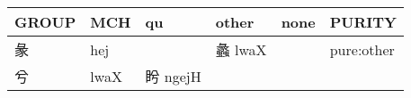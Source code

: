 \documentclass[14pt,a4paper]{scrartcl}
\begin{document}
\begin{longtable}[c]{@{}llllll@{}}
\toprule
\begin{minipage}[b]{0.14\columnwidth}\raggedright\strut
GROUP
\strut\end{minipage} &
\begin{minipage}[b]{0.14\columnwidth}\raggedright\strut
MCH
\strut\end{minipage} &
\begin{minipage}[b]{0.14\columnwidth}\raggedright\strut
qu
\strut\end{minipage} &
\begin{minipage}[b]{0.14\columnwidth}\raggedright\strut
other
\strut\end{minipage} &
\begin{minipage}[b]{0.14\columnwidth}\raggedright\strut
none
\strut\end{minipage} &
\begin{minipage}[b]{0.14\columnwidth}\raggedright\strut
PURITY
\strut\end{minipage}\tabularnewline
\midrule
\endhead
\begin{minipage}[t]{0.14\columnwidth}\raggedright\strut
彖
\strut\end{minipage} &
\begin{minipage}[t]{0.14\columnwidth}\raggedright\strut
hej
\strut\end{minipage} &
\begin{minipage}[t]{0.14\columnwidth}\raggedright\strut
\strut\end{minipage} &
\begin{minipage}[t]{0.14\columnwidth}\raggedright\strut
蠡 lwaX
\strut\end{minipage} &
\begin{minipage}[t]{0.14\columnwidth}\raggedright\strut
\strut\end{minipage} &
\begin{minipage}[t]{0.14\columnwidth}\raggedright\strut
pure:other
\strut\end{minipage}\tabularnewline
\begin{minipage}[t]{0.14\columnwidth}\raggedright\strut
兮
\strut\end{minipage} &
\begin{minipage}[t]{0.14\columnwidth}\raggedright\strut
lwaX
\strut\end{minipage} &
\begin{minipage}[t]{0.14\columnwidth}\raggedright\strut
盻 ngejH
\strut\end{minipage} &
\begin{minipage}[t]{0.14\columnwidth}\raggedright\strut

\end{minipage}
\end{longtable}
\end{document}
